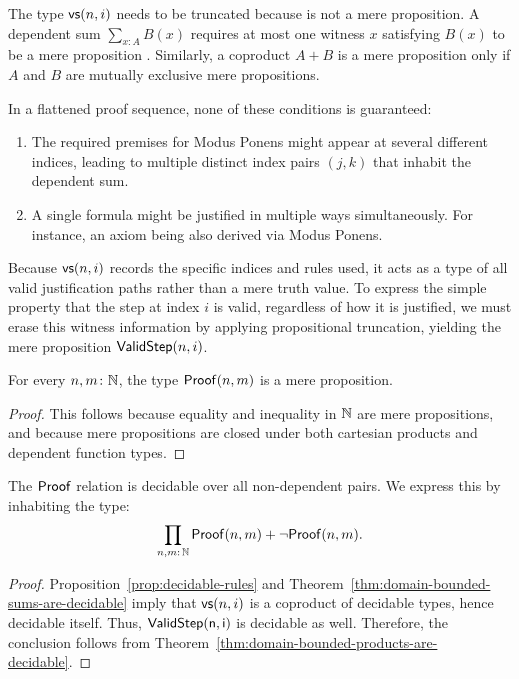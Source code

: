 \begin{rem}
    The type $\mathsf{vs}(n,i)$ needs to be truncated because is not a mere proposition. A dependent sum $\sum_{x\colon A}B(x)$ requires at most one witness $x$ satisfying $B(x)$ to be a mere proposition . Similarly, a coproduct $A+B$ is a mere proposition only if $A$ and $B$ are mutually exclusive mere propositions.
    
    In a flattened proof sequence, none of these conditions is guaranteed:
    \begin{enumerate}[-]
        \item The required premises for Modus Ponens might appear at several different indices, leading to multiple distinct index pairs $(j,k)$ that inhabit the dependent sum.
        
        \item A single formula might be justified in multiple ways simultaneously. For instance, an axiom being also derived via Modus Ponens.
    \end{enumerate}
    Because $\mathsf{vs}(n,i)$ records the specific indices and rules used, it acts as a type of all valid justification paths rather than a mere truth value. To express the simple property that the step at index $i$ is valid, regardless of how it is justified, we must erase this witness information by applying propositional truncation, yielding the mere proposition $\mathsf{ValidStep}(n,i)$.
\end{rem}

\begin{thm}
    For every\/ $n,m\colon\N$, the type\/ $\mathsf{Proof}(n,m)$ is a mere proposition.
\end{thm}

\begin{proof}
    This follows because equality and inequality in $\mathbb{N}$ are mere propositions, and because mere propositions are closed under both cartesian products and dependent function types.
\end{proof}

\begin{thm}
    The\/ $\mathsf{Proof}$ relation is decidable over all non-dependent pairs. We express this by inhabiting the type:
    \[
        \prod_{n,m\colon\N}
        \fun{Proof}(n,m)+\neg\fun{Proof}(n,m).
    \]
\end{thm}

\begin{proof}
    Proposition~\ref{prop:decidable-rules} and Theorem~\ref{thm:domain-bounded-sums-are-decidable} imply that $\mathsf{vs}(n,i)$ is a coproduct of decidable types, hence decidable itself. Thus, $\mathsf{ValidStep(n,i)}$ is decidable as well. Therefore, the conclusion follows from Theorem~\ref{thm:domain-bounded-products-are-decidable}.
\end{proof}

